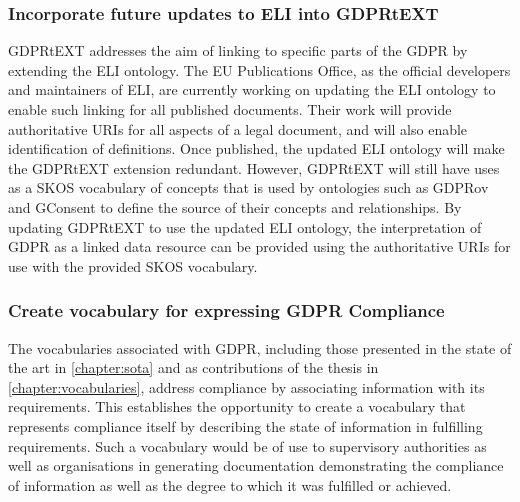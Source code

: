 \subsubsection{Incorporate future updates to ELI into GDPRtEXT}
GDPRtEXT addresses the aim of linking to specific parts of the GDPR by extending the ELI ontology. The EU Publications Office, as the official developers and maintainers of ELI, are currently working on updating the ELI ontology to enable such linking for all published documents. Their work will provide authoritative URIs for all aspects of a legal document, and will also enable identification of definitions. Once published, the updated ELI ontology will make the GDPRtEXT extension redundant. However, GDPRtEXT will still have uses as a SKOS vocabulary of concepts that is used by ontologies such as GDPRov and GConsent to define the source of their concepts and relationships. By updating GDPRtEXT to use the updated ELI ontology, the interpretation of GDPR as a linked data resource can be provided using the authoritative URIs for use with the provided SKOS vocabulary.

\subsubsection{Create vocabulary for expressing GDPR Compliance}
The vocabularies associated with GDPR, including those presented in the state of the art in \autoref{chapter:sota} and as contributions of the thesis in \autoref{chapter:vocabularies}, address compliance by associating information with its requirements. This establishes the opportunity to create a vocabulary that represents compliance itself by describing the state of information in fulfilling requirements. Such a vocabulary would be of use to supervisory authorities as well as organisations in generating documentation demonstrating the compliance of information as well as the degree to which it was fulfilled or achieved.



